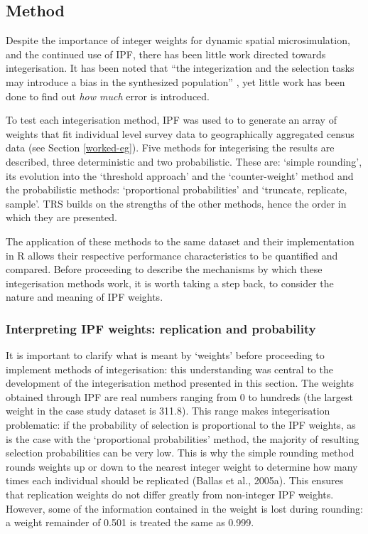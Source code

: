 \subsection{Method}
\label{strategies}
Despite the importance of integer weights for dynamic spatial microsimulation,
and the continued use of IPF, there
has been little work directed towards integerisation. It has been noted that
``the
integerization and the selection tasks may introduce a bias in the synthesized
population'' \citep[10]{Muller2010}, yet little work has been done to find out
\emph{how much} error is introduced.

To test each integerisation method, IPF was used to to generate an
array of weights that fit individual level survey data to
geographically aggregated census data (see Section \ref{worked-eg}). Five
methods for
integerising the results are described, three deterministic and two
probabilistic. These are: `simple rounding', its evolution into the `threshold
approach' and the `counter-weight' method and the probabilistic methods:
`proportional probabilities' and `truncate, replicate, sample'. TRS
builds on the strengths of the other methods, hence the order in which they are
presented.

The application of these methods to the same dataset and their implementation in R allows
their respective performance characteristics to be quantified and compared.
Before proceeding to describe the mechanisms by which these integerisation
methods work, it is worth taking a step back, to consider the nature and
meaning of IPF weights.

\subsubsection{Interpreting IPF weights: replication and probability}
It is important to clarify what is meant by `weights' before proceeding to
implement methods of integerisation: this understanding was central to the
development of the integerisation method presented in this section.
The weights obtained through IPF are real numbers ranging from 0 to hundreds
(the largest weight in the case study dataset is 311.8). This range
makes integerisation problematic: if the probability of selection is
proportional to the IPF weights, as is the case with the `proportional
probabilities' method,
the majority of resulting selection probabilities can be very low.
This is why the simple rounding method rounds weights up or down to the nearest
integer weight to determine how many times each individual should be
replicated (Ballas et al., 2005a). This ensures that replication weights do not differ
greatly from non-integer IPF weights. However, some of the information contained
in the weight is lost during rounding: a weight remainder of 0.501 is treated
the same as 0.999.

